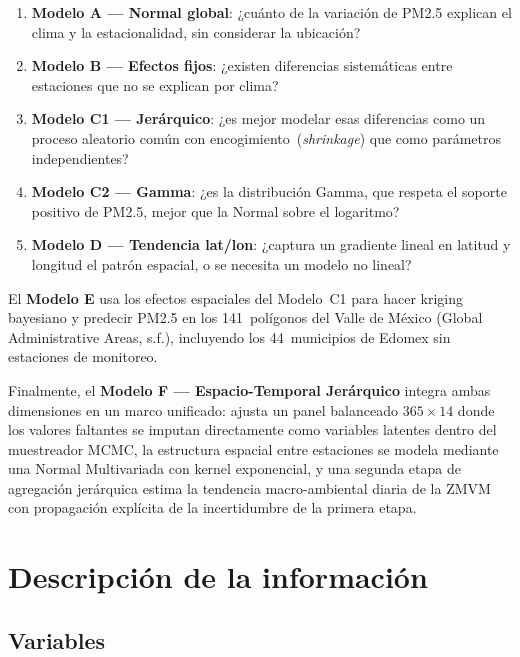 \documentclass[12pt]{article}
\begin{document}
\begin{enumerate}
  \item \textbf{Modelo A --- Normal global}: ¿cu\'anto de la variaci\'on de PM2.5
        explican el clima y la estacionalidad, sin considerar la ubicaci\'on?
  \item \textbf{Modelo B --- Efectos fijos}: ¿existen diferencias sistem\'aticas
        entre estaciones que no se explican por clima?
  \item \textbf{Modelo C1 --- Jer\'arquico}: ¿es mejor modelar esas diferencias
        como un proceso aleatorio com\'un con encogimiento~(\emph{shrinkage})
        que como par\'ametros independientes?
  \item \textbf{Modelo C2 --- Gamma}: ¿es la distribuci\'on Gamma, que respeta
        el soporte positivo de PM2.5, mejor que la Normal sobre el logaritmo?
  \item \textbf{Modelo D --- Tendencia lat/lon}: ¿captura un gradiente lineal
        en latitud y longitud el patr\'on espacial, o se necesita un modelo
        no lineal?
\end{enumerate}

El \textbf{Modelo E} usa los efectos espaciales del Modelo~C1
para hacer kriging bayesiano y predecir PM2.5 en los 141~pol\'igonos del
Valle de M\'exico (Global Administrative Areas, s.f.), incluyendo los
44~municipios de Edomex sin estaciones de monitoreo.

Finalmente, el \textbf{Modelo F --- Espacio-Temporal Jer\'arquico} integra
ambas dimensiones en un marco unificado: ajusta un panel balanceado
$365 \times 14$ donde los valores faltantes se imputan directamente
como variables latentes dentro del muestreador MCMC, la estructura
espacial entre estaciones se modela mediante una Normal Multivariada
con kernel exponencial, y una segunda etapa de agregaci\'on jer\'arquica
estima la tendencia macro-ambiental diaria de la ZMVM con propagaci\'on
expl\'icita de la incertidumbre de la primera etapa.


\section{Descripci\'on de la informaci\'on}

\subsection*{Variables}
\end{document}
